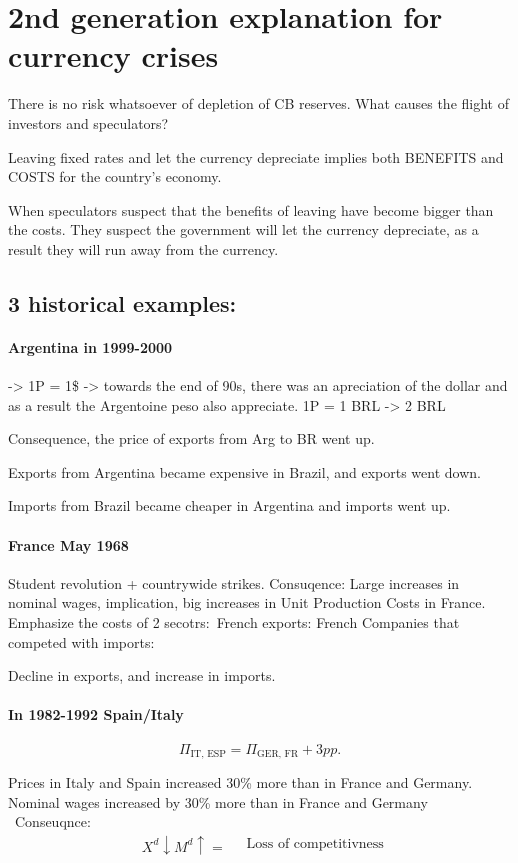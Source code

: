\documentclass{report}
\begin{document}
\section{2nd generation explanation for currency crises} 

There is no risk whatsoever of depletion of CB reserves. What causes the flight of investors and speculators?

Leaving fixed rates and let the currency depreciate implies both  BENEFITS and COSTS for the country’s economy. 

When speculators suspect that the benefits of leaving have become bigger than the costs. They suspect the government will let the currency depreciate, as a result they will run away from the currency. 

\subsection{3 historical examples:}
\paragraph{Argentina in 1999-2000}
-> 1P = 1\$ -> towards the end of 90s, there was an apreciation of the dollar and as a result the Argentoine peso also appreciate. 1P = 1 BRL -> 2 BRL

Consequence, the price of exports from Arg to BR went up. 

Exports from Argentina became expensive in Brazil, and exports went down. 

Imports from Brazil became cheaper in Argentina and imports went up.

\paragraph{France May 1968}
Student revolution + countrywide strikes. 
Consuqence: Large increases in nominal wages, implication, big increases in Unit Production Costs in France. Emphasize the costs of 2 secotrs:\
French exports: 
French Companies that competed with imports:

Decline in exports, and increase in imports. 

\paragraph{In 1982-1992 Spain/Italy}
$$\Pi_{\text{IT, ESP}} = \Pi_{\text{GER, FR}} + 3pp.$$

Prices in Italy and Spain increased 30\% more than in France and Germany. Nominal wages increased by 30\% more than in France and Germany \
Conseuqnce: 
$$\begin{array}{l|l}X^d \downarrow M^d  \uparrow = \end{array} \quad \text{Loss of competitivness}$$
\end{document}
